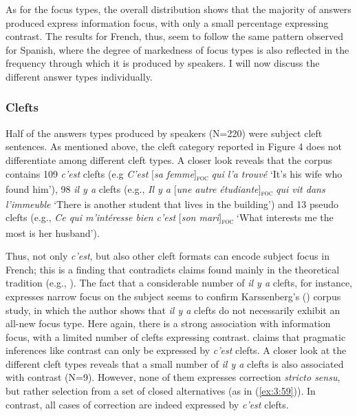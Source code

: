 As for the focus types, the overall distribution shows that the majority of answers produced express information focus, with only a small percentage expressing contrast. The results for French, thus, seem to follow the same pattern observed for Spanish, where the degree of markedness of focus types is also reflected in the frequency through which it is produced by speakers. I will now discuss the different answer types individually.

\subsubsection{Clefts}

Half of the answers types produced by speakers (N=220) were subject cleft sentences. As mentioned above, the cleft category reported in Figure 4 does not differentiate among different cleft types. A closer look reveals that the corpus contains 109 \textit{c'est} clefts (e.g \textit{C'est} [\textit{sa femme}]\textsubscript{\textsc{foc}} \normalsize \textit{qui l'a trouvé} `It's his wife who found him'), 98 \textit{il y a} clefts (e.g., \textit{Il y a} [\textit{\textit{une autre étudiante}}]\textsubscript{\textsc{foc}} \normalsize \textit{qui vit dans l'immeuble} `There is another student that lives in the building') and 13 pseudo clefts (e.g., \textit{Ce qui m'intéresse bien c'est} [\textit{s\textit{on mari}}]\textsubscript{\textsc{foc}} \normalsize `What interests me the most is her husband').

Thus, not only \textit{c'est}, but also other cleft formats can encode subject focus in French; this is a finding that contradicts claims found mainly in the theoretical tradition (e.g., \cite{lambrecht1996information}).
The fact that a considerable number of \textit{il y a} clefts, for instance, expresses narrow focus on the subject seems to confirm Karssenberg's (\citeyear{karssenberg2017oiseaux}) corpus study, in which the author shows that \textit{il y a} clefts do not necessarily exhibit an all-new focus type. 
Here again, there is a strong association with information focus, with a limited number of clefts expressing contrast. \textcite{lambrecht1996information} claims that pragmatic inferences like contrast can only be expressed by \textit{c'est} clefts. A closer look at the different cleft types reveals that a small number of \textit{il y a} clefts is also associated with contrast (N=9). However, none of them expresses correction \textit{stricto sensu}, but rather selection from a set of closed alternatives (as in (\ref{ex:3:59})). In contrast, all cases of correction are indeed expressed by \textit{c'est} clefts.

